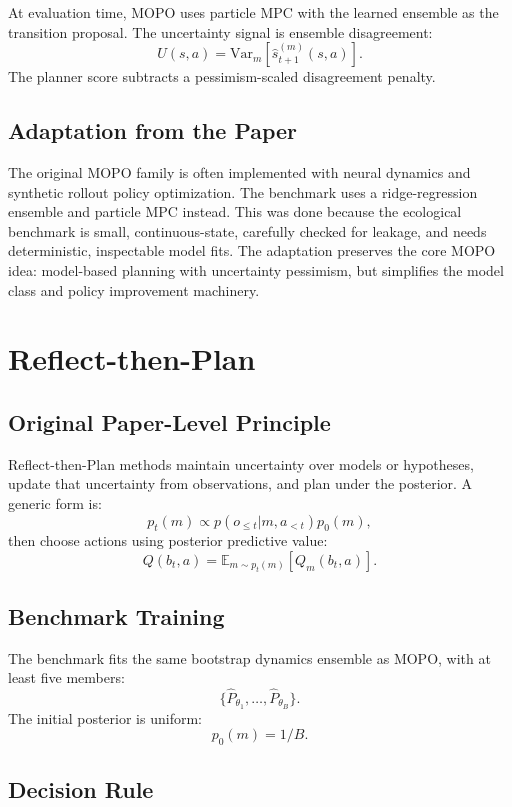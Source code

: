 \documentclass[11pt]{article}
\newcommand{\E}{\mathbb{E}}
\newcommand{\Var}{\mathrm{Var}}
\newcommand{\1}{\mathbf{1}}
\begin{document}
At evaluation time, MOPO uses particle MPC with the learned ensemble as the
transition proposal.  The uncertainty signal is ensemble disagreement:
\[
  U(s,a)=\Var_m[\hat{s}^{(m)}_{t+1}(s,a)].
\]
The planner score subtracts a pessimism-scaled disagreement penalty.

\subsection{Adaptation from the Paper}

The original MOPO family is often implemented with neural dynamics and synthetic
rollout policy optimization.  The benchmark uses a ridge-regression ensemble and
particle MPC instead.  This was done because the ecological benchmark is small,
continuous-state, carefully checked for leakage, and needs deterministic,
inspectable model fits.  The adaptation preserves the core MOPO idea:
model-based planning with uncertainty pessimism, but simplifies the model class
and policy improvement machinery.

\section{Reflect-then-Plan}

\subsection{Original Paper-Level Principle}

Reflect-then-Plan methods maintain uncertainty over models or hypotheses,
update that uncertainty from observations, and plan under the posterior.  A
generic form is:
\[
  p_t(m)\propto p(o_{\le t}|m,a_{<t})p_0(m),
\]
then choose actions using posterior predictive value:
\[
  Q(b_t,a)=\E_{m\sim p_t(m)}[Q_m(b_t,a)].
\]

\subsection{Benchmark Training}

The benchmark fits the same bootstrap dynamics ensemble as MOPO, with at least
five members:
\[
  \{\hat{P}_{\theta_1},\ldots,\hat{P}_{\theta_B}\}.
\]
The initial posterior is uniform:
\[
  p_0(m)=1/B.
\]

\subsection{Decision Rule}
\end{document}
